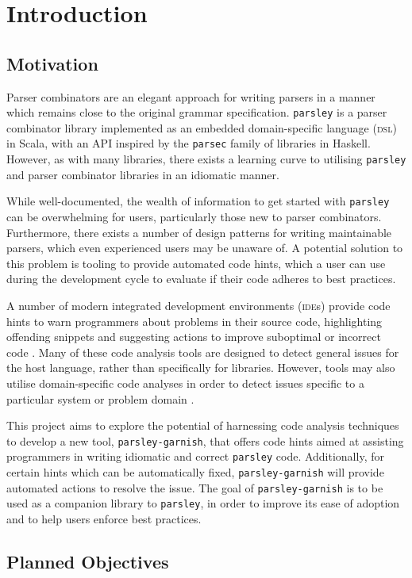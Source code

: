\chapter{Introduction}

\section{Motivation}
Parser combinators \cite{hutton_higher-order_1992} are an elegant approach for writing parsers in a manner which remains close to the original grammar specification.
\texttt{parsley} \cite{willis_garnishing_2018} is a parser combinator library implemented as an embedded domain-specific language (\textsc{dsl}) \cite{hudak_building_1996} in Scala, with an API inspired by the \texttt{parsec} \cite{leijen_parsec_2001} family of libraries in Haskell.
However, as with many libraries, there exists a learning curve to utilising \texttt{parsley} and parser combinator libraries in an idiomatic manner.

While well-documented, the wealth of information to get started with \texttt{parsley} can be overwhelming for users, particularly those new to parser combinators.
Furthermore, there exists a number of design patterns \cite{willis_design_2022} for writing maintainable parsers, which even experienced users may be unaware of.
A potential solution to this problem is tooling to provide automated code hints, which a user can use during the development cycle to evaluate if their code adheres to best practices.


A number of modern integrated development environments (\textsc{ide}s) provide code hints to warn programmers about problems in their source code, highlighting offending snippets and suggesting actions to improve suboptimal or incorrect code \cite{kurbatova_intellij_2021}.
Many of these code analysis tools are designed to detect general issues for the host language, rather than specifically for libraries.
However, tools may also utilise domain-specific code analyses in order to detect issues specific to a particular system or problem domain \cite{renggli_domain-specific_2010,gregor_stllint_2006,xunit_xunitanalyzers_2024}.

This project aims to explore the potential of harnessing code analysis techniques to develop a new tool, \texttt{parsley-garnish}, that offers code hints aimed at assisting programmers in writing idiomatic and correct \texttt{parsley} code.
Additionally, for certain hints which can be automatically fixed, \texttt{parsley-garnish} will provide automated actions to resolve the issue. %
The goal of \texttt{parsley-garnish} is to be used as a companion library to \texttt{parsley}, in order to improve its ease of adoption and to help users enforce best practices.

\section{Planned Objectives}
